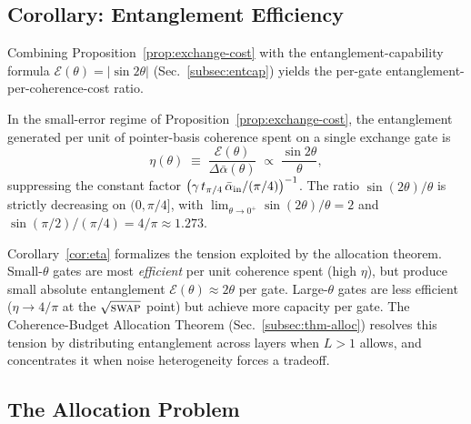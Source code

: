 \subsection{Corollary: Entanglement Efficiency}
\label{subsec:eff}

Combining Proposition~\ref{prop:exchange-cost} with the
entanglement-capability formula
$\mathcal{E}(\theta) = |\sin 2\theta|$ (Sec.~\ref{subsec:entcap})
yields the per-gate entanglement-per-coherence-cost ratio.

\begin{corollary}
\label{cor:eta}
In the small-error regime of
Proposition~\ref{prop:exchange-cost}, the entanglement
generated per unit of pointer-basis coherence spent on a single
exchange gate is
%
\begin{equation}
\label{eq:eta}
\eta(\theta) \;\equiv\;
  \frac{\mathcal{E}(\theta)}{\Delta\bar\alpha(\theta)}
  \;\propto\; \frac{\sin 2\theta}{\theta},
\end{equation}
%
suppressing the constant factor
$\bigl(\gamma\,t_{\pi/4}\,\bar\alpha_{\rm in}/(\pi/4)\bigr)^{-1}$.
The ratio $\sin(2\theta)/\theta$ is strictly decreasing on
$(0, \pi/4]$, with $\lim_{\theta\to 0^+}\sin(2\theta)/\theta = 2$
and $\sin(\pi/2)/(\pi/4) = 4/\pi \approx 1.273$.
\end{corollary}

\begin{remark}
Corollary~\ref{cor:eta} formalizes the tension exploited by the
allocation theorem.
Small-$\theta$ gates are most \emph{efficient} per unit coherence
spent (high $\eta$), but produce small absolute entanglement
$\mathcal{E}(\theta) \approx 2\theta$ per gate.
Large-$\theta$ gates are less efficient ($\eta \to 4/\pi$ at the
$\sqrt{\textsc{swap}}$ point) but achieve more capacity per gate.
The Coherence-Budget Allocation Theorem
(Sec.~\ref{subsec:thm-alloc}) resolves this tension by distributing
entanglement across layers when $L > 1$ allows, and concentrates it
when noise heterogeneity forces a tradeoff.
\end{remark}

\subsection{The Allocation Problem}
\label{subsec:problem}

